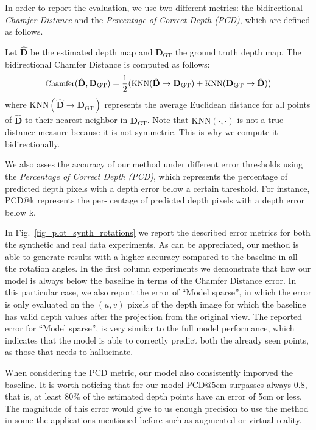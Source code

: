 In order to report the evaluation, we use two different metrics: the bidirectional \textit{Chamfer Distance} and the \textit{Percentage of Correct Depth (PCD)}, which are defined as follows. 

Let $\mathbf{\hat{D}}$ be the estimated depth map and $\mathbf{D}_{\textrm{GT}}$ the ground truth depth map. The bidirectional Chamfer Distance is computed as follows:
\begin{equation}
\begin{small}
\textrm{Chamfer}(\mathbf{\hat{D}}, \mathbf{D}_{\textrm{GT}})=\frac{1}{2}(\textrm{KNN}(\mathbf{\hat{D}} \rightarrow \mathbf{D}_{\textrm{GT}})+ \textrm{KNN}(\mathbf{D}_{\textrm{GT}} \rightarrow \mathbf{\hat{D}}))
\end{small}
\end{equation}
where $\textrm{KNN}(\mathbf{\hat{D}} \rightarrow \mathbf{D}_{\textrm{GT}})$ represents the average Euclidean distance for all points of $\mathbf{\hat{D}}$ to their nearest neighbor in $\mathbf{D}_{\textrm{GT}}$. Note that $\textrm{KNN}(\cdot ,\cdot)$ is not a true distance measure because it is not symmetric. This is why we compute it bidirectionally. 

We also asses the accuracy of our method under different error thresholds using the {\em Percentage of Correct Depth (PCD)}, which represents the percentage of predicted depth pixels with a depth error below a certain threshold. For instance, PCD@k represents the per- centage of predicted depth pixels with a depth error below k. 

In Fig.~\ref{fig_plot_synth_rotations} we report the described error metrics for both the synthetic and real data experiments. As can be appreciated, our method is able to generate results with a higher accuracy compared to the baseline in all the rotation angles. In the first column experiments we demonstrate that how our model is always below the baseline in terms of the Chamfer Distance error. In this particular case, we also report the error of ``Model sparse'', in which the error is only evaluated on the $(u,v)$ pixels of the depth image for which the baseline has valid depth values after the projection from the original view. The  reported error for ``Model sparse'', is very similar to the full model performance, which indicates that the model is able to correctly predict both the already seen points, as those that needs to hallucinate. 

When considering the PCD metric, our model also consistently imporved the baseline. It is  worth noticing that for our model PCD$@$5cm surpasses always 0.8, that is, at least $80\%$ of the estimated depth points have an error of 5cm or less. The magnitude of this error would give to us enough precision to use the method in some the applications mentioned before such as augmented or virtual reality.


